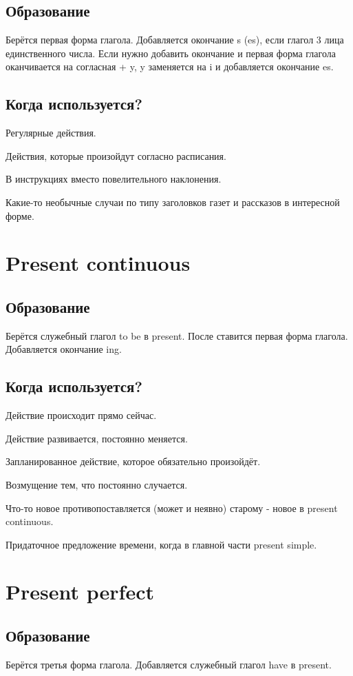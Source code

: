 \documentclass[oneside]{book}
\begin{document}
\subsection{Образование}
Берётся первая форма глагола. Добавляется окончание s (es),
если глагол 3 лица единственного числа. Если нужно добавить окончание и
первая форма глагола оканчивается на согласная + y, y заменяется на i и
добавляется окончание es.

\subsection{Когда используется?}
Регулярные действия.

Действия, которые произойдут согласно расписания.

В инструкциях вместо повелительного наклонения.

Какие-то необычные случаи по типу заголовков газет и рассказов в интересной форме.

\section{Present continuous}
\subsection{Образование}
Берётся служебный глагол to be в present. После ставится первая форма глагола.
Добавляется окончание ing.

\subsection{Когда используется?}
Действие происходит прямо сейчас.

Действие развивается, постоянно меняется.

Запланированное действие, которое обязательно произойдёт.

Возмущение тем, что постоянно случается.

 Что-то новое противопоставляется (может и неявно) старому - новое в present continuous.

Придаточное предложение времени, когда в главной части present simple.

\section{Present perfect}
\subsection{Образование}
Берётся третья форма глагола. Добавляется служебный глагол have в present.
\end{document}
